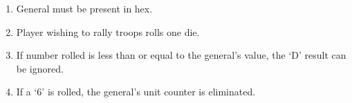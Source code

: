\begin{landscape}
\begin{minipage}[t]{0.485\textwidth}
{\begin{minipage}[t]{0.95\linewidth}
\begin{enumerate}\setlength{\itemsep}{0.15em}\setlength{\parskip}{0pt}\setlength{\topsep}{0.2em}
\item General must be present in hex.
\item Player wishing to rally troops rolls one die.
\item If number rolled is less than or equal to the general's value, the `D' result can be ignored.
\item If a `6' is rolled, the general's unit counter is eliminated.
\end{enumerate}
\end{minipage}%
}
\end{minipage}

\end{landscape}

\clearpage
\onecolumn

